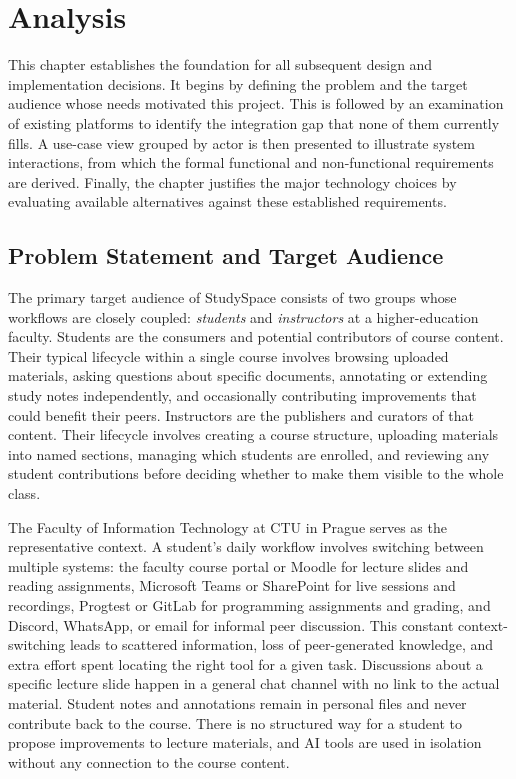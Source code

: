 \chapter{Analysis}
\label{ch:analysis}

This chapter establishes the foundation for all subsequent design and implementation decisions.
It begins by defining the problem and the target audience whose needs motivated this project.
This is followed by an examination of existing platforms to identify the integration gap that none
of them currently fills. A use-case view grouped by actor is then presented to illustrate system
interactions, from which the formal functional and non-functional requirements are derived. Finally,
the chapter justifies the major technology choices by evaluating available alternatives against
these established requirements.

\section{Problem Statement and Target Audience}
\label{sec:problem-statement}

The primary target audience of StudySpace consists of two groups whose workflows are closely
coupled: \emph{students} and \emph{instructors} at a higher-education faculty. Students are the
consumers and potential contributors of course content. Their typical lifecycle within a single
course involves browsing uploaded materials, asking questions about specific documents, annotating
or extending study notes independently, and occasionally contributing improvements that could
benefit their peers. Instructors are the publishers and curators of that content. Their lifecycle
involves creating a course structure, uploading materials into named sections, managing which
students are enrolled, and reviewing any student contributions before deciding whether to make them
visible to the whole class.

The Faculty of Information Technology at CTU in Prague serves as the representative context. A
student's daily workflow involves switching between multiple systems: the faculty course portal or
Moodle for lecture slides and reading assignments, Microsoft Teams or SharePoint for live sessions
and recordings, Progtest or GitLab for programming assignments and grading, and Discord, WhatsApp,
or email for informal peer discussion. This constant context-switching leads to scattered
information, loss of peer-generated knowledge, and extra effort spent locating the right tool for a
given task. Discussions about a specific lecture slide happen in a general chat channel with no link
to the actual material. Student notes and annotations remain in personal files and never contribute
back to the course. There is no structured way for a student to propose improvements to lecture
materials, and AI tools are used in isolation without any connection to the course content.

